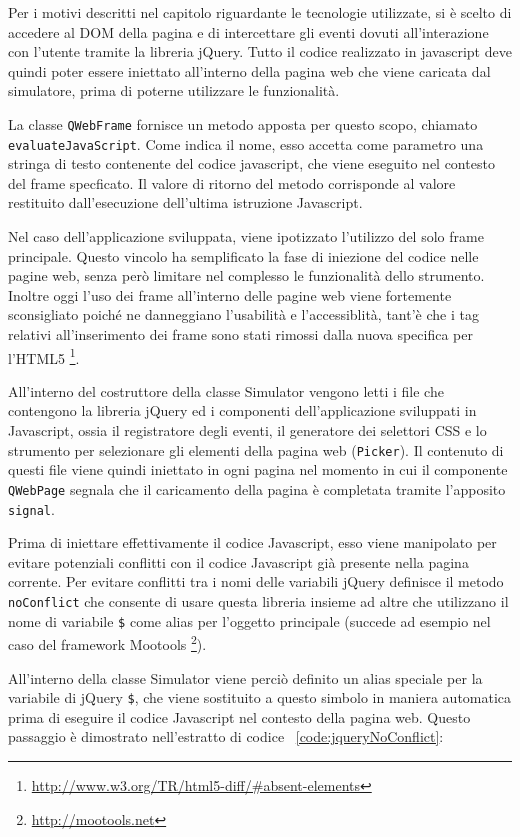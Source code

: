 Per i motivi descritti nel capitolo riguardante le tecnologie utilizzate, si è scelto di accedere al DOM della pagina e di intercettare gli eventi dovuti all'interazione con l'utente tramite la libreria jQuery. Tutto il codice realizzato in javascript deve quindi poter essere iniettato all'interno della pagina web che viene caricata dal simulatore, prima di poterne utilizzare le funzionalità. 

La classe \verb|QWebFrame| fornisce un metodo apposta per questo scopo, chiamato \verb|evaluateJavaScript|. Come indica il nome, esso accetta come parametro una stringa di testo contenente del codice javascript, che viene eseguito nel contesto del frame specficato. Il valore di ritorno del metodo corrisponde al valore restituito dall'esecuzione dell'ultima istruzione Javascript.

Nel caso dell'applicazione sviluppata, viene ipotizzato l'utilizzo del solo frame principale. Questo vincolo ha semplificato la fase di iniezione del codice nelle pagine web, senza però limitare nel complesso le funzionalità dello strumento. Inoltre oggi l'uso dei frame all'interno delle pagine web viene fortemente sconsigliato poiché ne danneggiano l'usabilità e l'accessiblità, tant'è che i tag relativi all'inserimento dei frame sono stati rimossi dalla nuova specifica per l'HTML5 \footnote{\url{http://www.w3.org/TR/html5-diff/\#absent-elements}}. 

All'interno del costruttore della classe Simulator vengono letti i file che contengono la libreria jQuery ed i componenti dell'applicazione sviluppati in Javascript, ossia il registratore degli eventi, il generatore dei selettori CSS e lo strumento per selezionare gli elementi della pagina web (\verb|Picker|). Il contenuto di questi file viene quindi iniettato in ogni pagina nel momento in cui il componente \verb|QWebPage| segnala che il caricamento della pagina è completata tramite l'apposito  \verb|signal|. 

Prima di iniettare effettivamente il codice Javascript, esso viene manipolato per evitare potenziali conflitti con il codice Javascript già presente nella pagina corrente. Per evitare conflitti tra i nomi delle variabili jQuery definisce il metodo \verb|noConflict| che consente di usare questa libreria insieme ad altre che utilizzano il nome di variabile \verb|$| come alias per l'oggetto principale (succede ad esempio nel caso del framework Mootools \footnote{\url{http://mootools.net}}). 

All'interno della classe Simulator viene perciò definito un alias speciale per la variabile di jQuery \verb|$|, che viene sostituito a questo simbolo in maniera automatica prima di eseguire il codice Javascript nel contesto della pagina web. Questo passaggio è dimostrato nell'estratto di codice ~\ref{code:jqueryNoConflict}:

